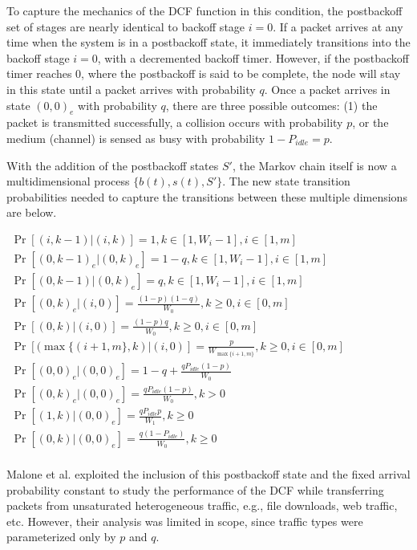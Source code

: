 \documentclass[conference]{IEEEtran}
\begin{document}
To capture the mechanics of the DCF function in this condition, the postbackoff set of stages are nearly identical to backoff stage $i = 0$. If a packet arrives at any time when the system is in a postbackoff state, it immediately transitions into the backoff stage $i = 0$, with a decremented backoff timer. However, if the postbackoff timer reaches $0$, where the postbackoff is said to be complete, the node will stay in this state until a packet arrives with probability $q$. Once a packet arrives in state $(0, 0)_e$ with probability $q$, there are three possible outcomes: (1) the packet is transmitted successfully, a collision occurs with probability $p$, or the medium (channel) is sensed as busy with probability $1 - P_{idle} = p$. 

With the addition of the postbackoff states $S'$, the Markov chain itself is now a multidimensional process $\{b(t), s(t), S' \}$. The new state transition probabilities needed to capture the transitions between these multiple dimensions are below.

\begin{center}
\begin{math}
\begin{array}{lll}
\Pr[(i,k-1) | (i, k)] = 1, k \in [1, W_i-1], i \in [1,m] \\
\Pr[(0,k-1)_e | (0, k)_e] = 1-q, k \in [1, W_i-1], i \in [1,m] \\
\Pr[(0,k-1) | (0, k)_e] = q, k \in [1, W_i-1], i \in [1,m] \\
\Pr[(0,k)_e | (i, 0)] = \frac{(1-p)(1-q)}{W_0}, k \geq 0, i \in [0,m] \\
\Pr[(0,k) | (i, 0)] = \frac{(1-p)q}{W_0}, k \geq 0 ,i \in [0,m] \\
\Pr[(\max\{(i+1,m\}, k) | (i, 0)] = \frac{p}{W_{\max\{i+1,m\}}}, k \geq 0, i \in [0,m] \\
\Pr[(0,0)_e | (0, 0)_e] = 1 - q + \frac{qP_{idle}(1 - p)}{W_0} \\
\Pr[(0,k)_e | (0, 0)_e] = \frac{qP_{idle}(1 - p)}{W_0}, k > 0 \\
\Pr[(1,k) | (0, 0)_e] = \frac{qP_{idle}p}{W_1}, k \geq 0 \\
\Pr[(0,k) | (0, 0)_e] = \frac{q(1 - P_{idle})}{W_0}, k \geq 0 \\
\end{array}
\end{math}
\end{center}

Malone et al. \cite{dcf-nonsaturated} exploited the inclusion of this postbackoff state and the fixed arrival probability constant to study the performance of the DCF while transferring packets from unsaturated heterogeneous traffic, e.g., file downloads, web traffic, etc. However, their analysis was limited in scope, since traffic types were parameterized only by $p$ and $q$.
\end{document}
